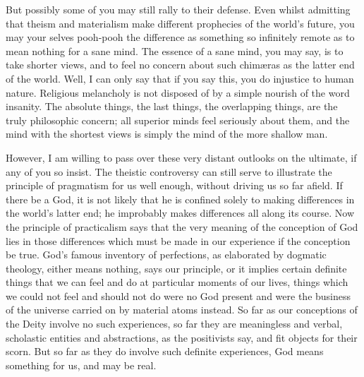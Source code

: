 \documentclass[]{article}
\begin{document}
But possibly some of you may still rally to their defense. Even whilst admitting that theism and materialism make different prophecies of the world's future, you may your selves pooh-pooh the difference as something so infinitely remote as to mean nothing for a sane mind. The essence of a sane mind, you may say, is to take shorter views, and to feel no concern about such chim{\ae}ras as the latter end of the world. Well, I can only say that if you say this, you do injustice to human nature. Religious melancholy is not disposed of by a simple nourish of the word insanity. The absolute things, the last things, the overlapping things, are the truly philosophic concern; all superior minds feel seriously about them, and the mind with the shortest views is simply the mind of the more shallow man. 

However, I am willing to pass over these very distant outlooks on the ultimate, if any of you so insist. The theistic controversy can still serve to illustrate the principle of pragmatism for us well enough, without driving us so far afield. If there be a God, it is not likely that he is confined solely to making differences in the world's latter end; he improbably makes differences all along its course. Now the principle of practicalism says that the very meaning of the conception of God lies in those differences which must be made in our experience if the conception be true. God's famous inventory of perfections, as elaborated by dogmatic theology, either means nothing, says our principle, or it implies certain definite things that we can feel and do at particular moments of our lives, things which we could not feel and should not do were no God present and were the business of the universe carried on by material atoms instead. So far as our conceptions of the Deity involve no such experiences, so far they are meaningless and verbal, scholastic entities and abstractions, as the positivists say, and fit objects for their scorn. But so far as they do involve such definite experiences, God means something for us, and may be real. 
\end{document}
